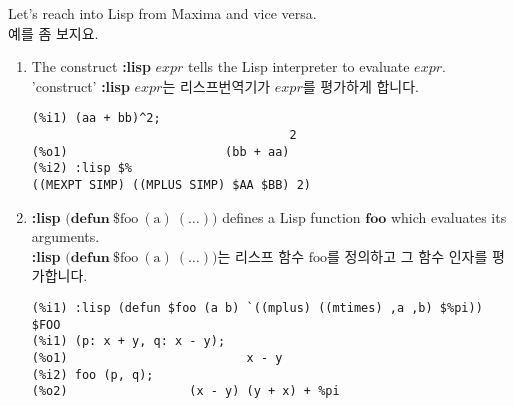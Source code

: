 \documentclass[12pt]{article}
\begin{document}
Let's reach into Lisp from Maxima and vice versa. \\
예를 좀 보지요.

\begin{enumerate}

\item The construct {\bf :lisp} $\mathit{expr}$ tells the Lisp interpreter
to evaluate $\mathit{expr}$. \\
'construct' {\bf :lisp} $\mathit{expr}$는 리스프번역기가 $\mathit{expr}$를 평가하게 합니다.

\begin{verbatim}
(%i1) (aa + bb)^2;
                                    2
(%o1)                      (bb + aa)
(%i2) :lisp $%
((MEXPT SIMP) ((MPLUS SIMP) $AA $BB) 2)
\end{verbatim}

\item {\bf :lisp} $\mathrm{(}\mathbf{defun\ } \mathrm{\$foo\ (a)\ (\ldots))}$
defines a Lisp function $\mathbf{foo}$ which evaluates its arguments. \\
{\bf :lisp} $\mathrm{(}\mathbf{defun\ } \mathrm{\$foo\ (a)\ (\ldots))}$는
리스프 함수 $\mathrm{foo}$를 정의하고 그 함수 인자를 평가합니다. 

\begin{verbatim}
(%i1) :lisp (defun $foo (a b) `((mplus) ((mtimes) ,a ,b) $%pi))
$FOO
(%i1) (p: x + y, q: x - y);
(%o1)                         x - y
(%i2) foo (p, q);
(%o2)                 (x - y) (y + x) + %pi
\end{verbatim}


\end{enumerate}
\end{document}
